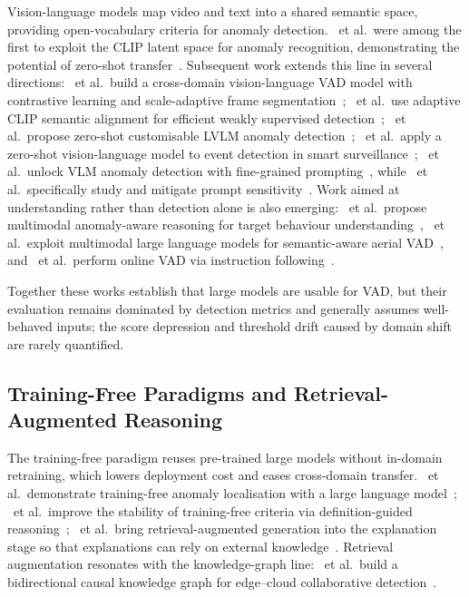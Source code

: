 Vision-language models map video and text into a shared semantic space, providing open-vocabulary criteria for anomaly detection. \citeauthor{zanella2024clip}~et al.\ were among the first to exploit the CLIP latent space for anomaly recognition, demonstrating the potential of zero-shot transfer~\cite{zanella2024clip}. Subsequent work extends this line in several directions: \citeauthor{biswas2025mmvad}~et al.\ build a cross-domain vision-language VAD model with contrastive learning and scale-adaptive frame segmentation~\cite{biswas2025mmvad}; \citeauthor{kang2025clipalign}~et al.\ use adaptive CLIP semantic alignment for efficient weakly supervised detection~\cite{kang2025clipalign}; \citeauthor{ahn2026anyanomaly}~et al.\ propose zero-shot customisable LVLM anomaly detection~\cite{ahn2026anyanomaly}; \citeauthor{kebour2025zeroshot}~et al.\ apply a zero-shot vision-language model to event detection in smart surveillance~\cite{kebour2025zeroshot}; \citeauthor{zou2026prompting}~et al.\ unlock VLM anomaly detection with fine-grained prompting~\cite{zou2026prompting}, while \citeauthor{ignatosyan2026prompt}~et al.\ specifically study and mitigate prompt sensitivity~\cite{ignatosyan2026prompt}. Work aimed at understanding rather than detection alone is also emerging: \citeauthor{zhou2026targetvau}~et al.\ propose multimodal anomaly-aware reasoning for target behaviour understanding~\cite{zhou2026targetvau}, \citeauthor{li2026aerial}~et al.\ exploit multimodal large language models for semantic-aware aerial VAD~\cite{li2026aerial}, and \citeauthor{yang2025monitor}~et al.\ perform online VAD via instruction following~\cite{yang2025monitor}.

Together these works establish that large models are usable for VAD, but their evaluation remains dominated by detection metrics and generally assumes well-behaved inputs; the score depression and threshold drift caused by domain shift are rarely quantified.

\subsection{Training-Free Paradigms and Retrieval-Augmented Reasoning}

The training-free paradigm reuses pre-trained large models without in-domain retraining, which lowers deployment cost and eases cross-domain transfer. \citeauthor{zanella2024trainingfree}~et al.\ demonstrate training-free anomaly localisation with a large language model~\cite{zanella2024trainingfree}; \citeauthor{pei2026drvad}~et al.\ improve the stability of training-free criteria via definition-guided reasoning~\cite{pei2026drvad}; \citeauthor{sun2026rag4vad}~et al.\ bring retrieval-augmented generation into the explanation stage so that explanations can rely on external knowledge~\cite{sun2026rag4vad}. Retrieval augmentation resonates with the knowledge-graph line: \citeauthor{wang2025holotrace}~et al.\ build a bidirectional causal knowledge graph for edge--cloud collaborative detection~\cite{wang2025holotrace}.

